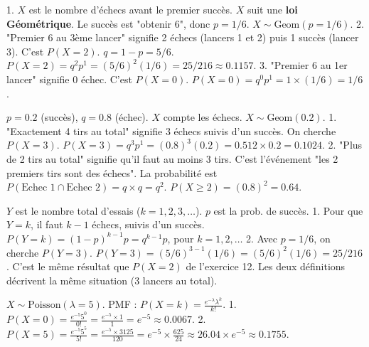 
\begin{correctionbox}
1.  $X$ est le nombre d'échecs avant le premier succès. $X$ suit une \textbf{loi Géométrique}.
    Le succès est "obtenir 6", donc $p = 1/6$. $X \sim \text{Geom}(p=1/6)$.
2.  "Premier 6 au 3ème lancer" signifie 2 échecs (lancers 1 et 2) puis 1 succès (lancer 3).
    C'est $P(X=2)$. $q = 1-p = 5/6$.
    $P(X=2) = q^2 p^1 = (5/6)^2 (1/6) = 25/216 \approx 0.1157$.
3.  "Premier 6 au 1er lancer" signifie 0 échec. C'est $P(X=0)$.
    $P(X=0) = q^0 p^1 = 1 \times (1/6) = 1/6$.
\end{correctionbox}

\begin{correctionbox}
$p=0.2$ (succès), $q=0.8$ (échec). $X$ compte les échecs. $X \sim \text{Geom}(0.2)$.
1.  "Exactement 4 tirs au total" signifie 3 échecs suivis d'un succès. On cherche $P(X=3)$.
    $P(X=3) = q^3 p^1 = (0.8)^3 (0.2) = 0.512 \times 0.2 = 0.1024$.
2.  "Plus de 2 tirs au total" signifie qu'il faut au moins 3 tirs. C'est l'événement "les 2 premiers tirs sont des échecs".
    La probabilité est $P(\text{Echec 1} \cap \text{Echec 2}) = q \times q = q^2$.
    $P(X \ge 2) = (0.8)^2 = 0.64$.
\end{correctionbox}

\begin{correctionbox}
$Y$ est le nombre total d'essais ($k=1, 2, 3, \dots$). $p$ est la prob. de succès.
1.  Pour que $Y=k$, il faut $k-1$ échecs, suivis d'un succès.
    $P(Y=k) = (1-p)^{k-1} p = q^{k-1} p$, pour $k=1, 2, \dots$
2.  Avec $p=1/6$, on cherche $P(Y=3)$.
    $P(Y=3) = (5/6)^{3-1} (1/6) = (5/6)^2 (1/6) = 25/216$.
    C'est le même résultat que $P(X=2)$ de l'exercice 12. Les deux définitions décrivent la même situation (3 lancers au total).
\end{correctionbox}


\begin{correctionbox}
$X \sim \text{Poisson}(\lambda=5)$. PMF : $P(X=k) = \frac{e^{-\lambda} \lambda^k}{k!}$.
1.  $P(X=0) = \frac{e^{-5} 5^0}{0!} = \frac{e^{-5} \times 1}{1} = e^{-5} \approx 0.0067$.
2.  $P(X=5) = \frac{e^{-5} 5^5}{5!} = \frac{e^{-5} \times 3125}{120} = e^{-5} \times \frac{625}{24} \approx 26.04 \times e^{-5} \approx 0.1755$.
\end{correctionbox}

